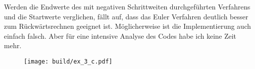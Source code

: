 Werden die Endwerte des mit negativen Schrittweiten durchgeführten Verfahrens und die Startwerte verglichen, fällt auf,
dass das Euler Verfahren deutlich besser zum Rückwärtsrechnen geeignet ist. Möglicherweise ist die Implementierung auch einfach falsch.
Aber für eine intensive Analyse des Codes habe ich keine Zeit mehr.
\begin{figure}
    \centering
    \texttt{[image: build/ex\_3\_c.pdf]}
\end{figure}
